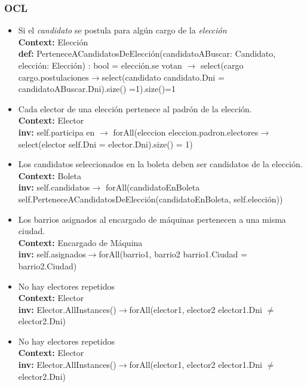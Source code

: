 \documentclass[spanish, 10pt,a4paper]{article}
\numberwithin{equation}{section} %
\begin{document}
\subsubsection{OCL}
\begin{itemize}
	\item Si el \textit{candidato} se postula para algún cargo de la \textit{elección}
\\	\textbf{Context: }  Elección
\\	\textbf{def: }PerteneceACandidatosDeElección(candidatoABuscar: Candidato, elección: Elección) : bool = elección.se votan $\rightarrow$ select(cargo \textbar cargo.postulaciones$\rightarrow$select(candidato \textbar candidato.Dni = candidatoABuscar.Dni).size() =1).size()=1

	\item Cada elector de una elección pertenece al padrón de la elección.
\\	\textbf{Context: }  Elector
\\	\textbf{inv: }self.participa en $\rightarrow$ forAll(eleccion \textbar eleccion.padron.electores$\rightarrow$select(elector \textbar self.Dni = elector.Dni).size() = 1)

	\item Los candidatos seleccionados en la boleta deben ser candidatos de la elección.
\\	\textbf{Context: }  Boleta
\\	\textbf{inv: }self.candidatos$\rightarrow$ forAll(candidatoEnBoleta \textbar self.PerteneceACandidatosDeElección(candidatoEnBoleta, self.elección))

	\item Los barrios asignados al encargado de máquinas pertenecen a una misma ciudad.
\\	\textbf{Context: }  Encargado de Máquina
\\	\textbf{inv: } self.asignados$\rightarrow$forAll(barrio1, barrio2 \textbar barrio1.Ciudad = barrio2.Ciudad)

	\item No hay electores repetidos
\\	\textbf{Context: }  Elector
\\	\textbf{inv: } Elector.AllInstances()$\rightarrow$forAll(elector1, elector2 \textbar elector1.Dni $\neq$ elector2.Dni)

	\item No hay electores repetidos
\\	\textbf{Context: }  Elector
\\	\textbf{inv: } Elector.AllInstances()$\rightarrow$forAll(elector1, elector2 \textbar elector1.Dni $\neq$ elector2.Dni)


\end{itemize}
\end{document}
